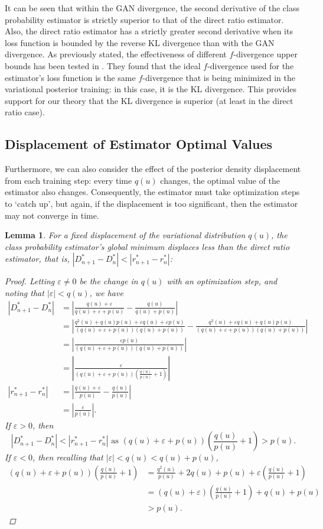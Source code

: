 \documentclass[honours,12pt]{unswthesis}
\newtheorem{lemma}[theorem]{Lemma}
\numberwithin{equation}{section}
\theoremstyle{definition}
\begin{document}
It can be seen that within the GAN divergence, the second derivative of the class probability estimator is strictly superior to that of the direct ratio estimator. Also, the direct ratio estimator has a strictly greater second derivative when its loss function is bounded by the reverse KL divergence than with the GAN divergence.
As previously stated, the effectiveness of different $f$-divergence upper bounds has been tested in \citet{nowozin}. They found that the ideal $f$-divergence used for the estimator's loss function is the same $f$-divergence that is being minimized in the variational posterior training: in this case, it is the KL divergence. This provides support for our theory that the KL divergence is superior (at least in the direct ratio case).
\subsection{Displacement of Estimator Optimal Values}
Furthermore, we can also consider the effect of the posterior density displacement from each training step: every time $q(u)$ changes, the optimal value of the estimator also changes. Consequently, the estimator must take optimization steps to `catch up', but again, if the displacement is too significant, then the estimator may not converge in time.
\begin{lemma}
For a fixed displacement of the variational distribution $q(u)$, the class probability estimator's global minimum displaces less than the direct ratio estimator, that is, $|D^*_{n+1}-D^*_{n}|<|r^*_{n+1}-r^*_{n}|$:
\begin{proof}
Letting $\varepsilon\neq0$ be the change in $q(u)$ with an optimization step, and noting that $|\varepsilon|<q(u)$, we have
\begin{align*}
|D^*_{n+1}-D^*_{n}|&=\left|\frac{q(u)+\varepsilon}{q(u)+\varepsilon+p(u)}-\frac{q(u)}{q(u)+p(u)}\right|\\
&=\left|\frac{q^2(u)+q(u)p(u)+\varepsilon q(u)+\varepsilon p(u)}{(q(u)+\varepsilon+p(u))(q(u)+p(u))}-\frac{q^2(u)+\varepsilon q(u)+q(u)p(u)}{(q(u)+\varepsilon+p(u))(q(u)+p(u))}\right|\\
&=\left|\frac{\varepsilon p(u)}{(q(u)+\varepsilon+p(u))(q(u)+p(u))}\right|\\
&=\left|\frac{\varepsilon}{(q(u)+\varepsilon+p(u))\left(\frac{q(u)}{p(u)}+1\right)}\right|\\
|r^*_{n+1}-r^*_{n}|&=\left|\frac{q(u)+\varepsilon}{p(u)}-\frac{q(u)}{p(u)}\right|\\
&=\left|\frac{\varepsilon}{p(u)}\right|.
\end{align*}
If $\varepsilon>0$, then
\[|D^*_{n+1}-D^*_{n}|<|r^*_{n+1}-r^*_{n}|\text{ as }(q(u)+\varepsilon+p(u))\left(\frac{q(u)}{p(u)}+1\right)>p(u).\]
If $\varepsilon<0$, then recalling that $|\varepsilon| < q(u) < q(u)+p(u)$,
\begin{align*}
(q(u)+\varepsilon+p(u))(\frac{q(u)}{p(u)}+1)&=\frac{q^2(u)}{p(u)}+2q(u)+p(u)+\varepsilon \left(\frac{q(u)}{p(u)}+1\right)\\
&=(q(u)+\varepsilon)\left(\frac{q(u)}{p(u)}+1\right)+q(u)+p(u)\\
&>p(u).
\end{align*}
\end{proof}
\end{lemma}
\end{document}
